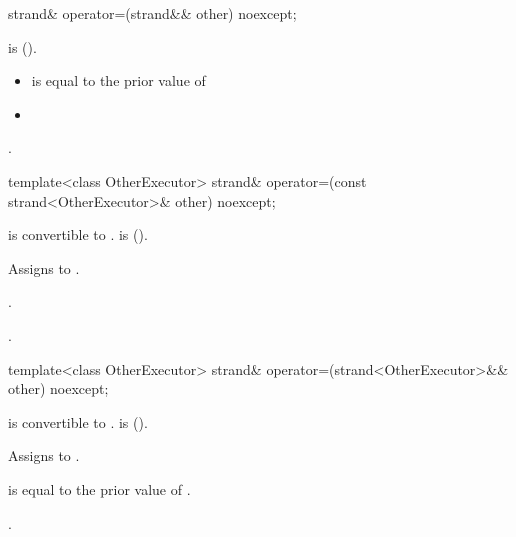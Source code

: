 \begin{itemdecl}
strand& operator=(strand&& other) noexcept;
\end{itemdecl}

\begin{itemdescr}
\pnum
\requires {} is  ().

\pnum
\postconditions 
\begin{itemize}
\item
{} is equal to the prior value of 
\item
{}
\end{itemize}

\pnum
\returns {}.
\end{itemdescr}

\begin{itemdecl}
template<class OtherExecutor> strand& operator=(const strand<OtherExecutor>& other) noexcept;
\end{itemdecl}

\begin{itemdescr}
\pnum
\requires {} is convertible to .  is  ().

\pnum
\effects Assigns  to .

\pnum
\postconditions {}.

\pnum
\returns {}.
\end{itemdescr}

\begin{itemdecl}
template<class OtherExecutor> strand& operator=(strand<OtherExecutor>&& other) noexcept;
\end{itemdecl}

\begin{itemdescr}
\pnum
\requires {} is convertible to .  is  ().

\pnum
\effects Assigns  to .

\pnum
\postconditions {} is equal to the prior value of .

\pnum
\returns {}.
\end{itemdescr}




